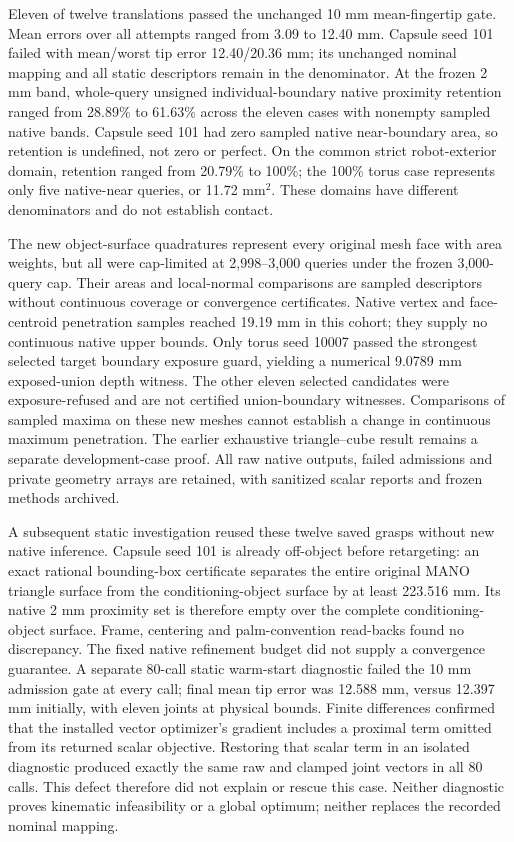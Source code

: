 \documentclass[10pt,letterpaper]{article}
\begin{document}
Eleven of twelve translations passed the unchanged 10 mm mean-fingertip gate.
Mean errors over all attempts ranged from 3.09 to 12.40 mm. Capsule seed 101
failed with mean/worst tip error 12.40/20.36 mm; its unchanged nominal mapping
and all static descriptors remain in the denominator. At the frozen 2 mm band,
whole-query unsigned individual-boundary native proximity retention ranged
from 28.89\% to 61.63\% across the eleven cases with nonempty sampled native
bands. Capsule seed 101 had zero sampled native near-boundary area,
so retention is undefined, not zero or perfect. On the common strict
robot-exterior domain, retention ranged from 20.79\% to 100\%; the 100\% torus
case represents only five native-near queries, or 11.72 $\mathrm{mm}^2$.
These domains have different denominators and do not establish contact.

The new object-surface quadratures represent every original mesh face with
area weights, but all were cap-limited at 2,998--3,000 queries under the frozen
3,000-query cap. Their areas
and local-normal comparisons are sampled descriptors without continuous
coverage or convergence certificates. Native vertex and face-centroid
penetration samples reached 19.19 mm in this cohort; they supply no continuous
native upper bounds. Only torus seed 10007 passed the strongest selected target
boundary exposure guard, yielding a numerical 9.0789 mm exposed-union depth
witness. The other eleven selected candidates were exposure-refused and are
not certified union-boundary witnesses. Comparisons of sampled maxima on these
new meshes cannot establish a change in continuous maximum penetration. The
earlier exhaustive triangle--cube result remains a separate development-case
proof. All raw native outputs, failed admissions and private geometry arrays
are retained, with sanitized scalar reports and frozen methods archived.

A subsequent static investigation reused these twelve saved grasps without
new native inference. Capsule seed 101 is already off-object before retargeting:
an exact rational bounding-box certificate separates the entire original MANO
triangle surface from the conditioning-object surface by at least 223.516 mm.
Its native 2 mm proximity set is therefore empty over the complete
conditioning-object surface. Frame, centering and palm-convention
read-backs found no discrepancy. The fixed native refinement budget did not
supply a convergence guarantee. A separate 80-call static warm-start diagnostic
failed the 10 mm admission gate at every call; final mean tip error was
12.588 mm, versus 12.397 mm initially, with eleven joints at physical bounds.
Finite differences confirmed that the installed vector optimizer's gradient
includes a proximal term omitted from its returned scalar objective. Restoring
that scalar term in an isolated diagnostic produced exactly the same raw and
clamped joint vectors in all 80 calls. This defect therefore did not explain
or rescue this case. Neither diagnostic proves kinematic infeasibility or a
global optimum; neither replaces the recorded nominal mapping.
\end{document}

